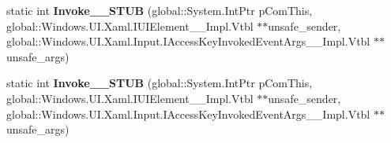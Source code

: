 \begin{DoxyCompactItemize}
static int {\bfseries Invoke\+\_\+\+\_\+\+S\+T\+UB} (global\+::\+System.\+Int\+Ptr p\+Com\+This, global\+::\+Windows.\+U\+I.\+Xaml.\+I\+U\+I\+Element\+\_\+\+\_\+\+Impl.\+Vtbl $\ast$$\ast$unsafe\+\_\+sender, global\+::\+Windows.\+U\+I.\+Xaml.\+Input.\+I\+Access\+Key\+Invoked\+Event\+Args\+\_\+\+\_\+\+Impl.\+Vtbl $\ast$$\ast$unsafe\+\_\+args)
\item 
\mbox{\label{struct_windows_1_1_foundation_1_1_typed_event_handler___a___windows___u_i___xaml___u_i_element__faa94360fa5e602dc59cfec6def5e27f_a2c646b44fb84b6b76fc1c916dffcf872}} 
static int {\bfseries Invoke\+\_\+\+\_\+\+S\+T\+UB} (global\+::\+System.\+Int\+Ptr p\+Com\+This, global\+::\+Windows.\+U\+I.\+Xaml.\+I\+U\+I\+Element\+\_\+\+\_\+\+Impl.\+Vtbl $\ast$$\ast$unsafe\+\_\+sender, global\+::\+Windows.\+U\+I.\+Xaml.\+Input.\+I\+Access\+Key\+Invoked\+Event\+Args\+\_\+\+\_\+\+Impl.\+Vtbl $\ast$$\ast$unsafe\+\_\+args)
\end{DoxyCompactItemize}
